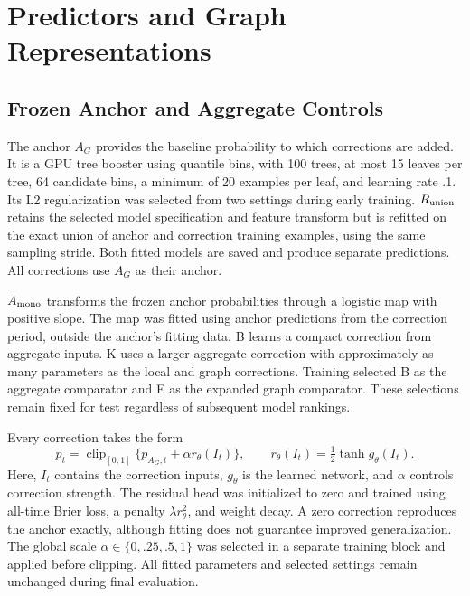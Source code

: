 \documentclass{llncs}
\begin{document}
\section{Predictors and Graph Representations}
\subsection{Frozen Anchor and Aggregate Controls}
The anchor $A_G$ provides the baseline probability to which corrections are added. It is a GPU tree booster using quantile bins, with 100 trees, at most 15 leaves per tree, 64 candidate bins, a minimum of 20 examples per leaf, and learning rate .1. Its L2 regularization was selected from two settings during early training. $R_{\rm union}$ retains the selected model specification and feature transform but is refitted on the exact union of anchor and correction training examples, using the same sampling stride. Both fitted models are saved and produce separate predictions. All corrections use $A_G$ as their anchor.

$A_{\rm mono}$ transforms the frozen anchor probabilities through a logistic map with positive slope. The map was fitted using anchor predictions from the correction period, outside the anchor's fitting data. B learns a compact correction from aggregate inputs. K uses a larger aggregate correction with approximately as many parameters as the local and graph corrections. Training selected B as the aggregate comparator and E as the expanded graph comparator. These selections remain fixed for test regardless of subsequent model rankings.

Every correction takes the form
\begin{equation}
 p_t=\operatorname{clip}_{[0,1]}\{p_{A_G,t}+\alpha r_\theta(I_t)\},
 \qquad r_\theta(I_t)=\tfrac12\tanh g_\theta(I_t).
\label{eq:correction}
\end{equation}
Here, $I_t$ contains the correction inputs, $g_\theta$ is the learned network, and $\alpha$ controls correction strength. The residual head was initialized to zero and trained using all-time Brier loss, a penalty $\lambda r_\theta^2$, and weight decay. A zero correction reproduces the anchor exactly, although fitting does not guarantee improved generalization. The global scale $\alpha\in\{0,\allowbreak .25,\allowbreak .5,1\}$ was selected in a separate training block and applied before clipping. All fitted parameters and selected settings remain unchanged during final evaluation.
\end{document}

